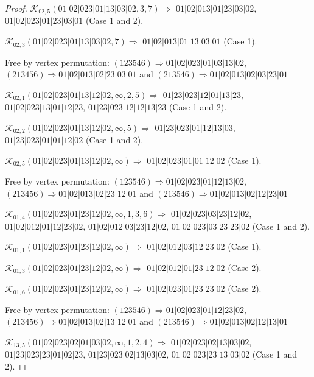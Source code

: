 \documentclass[12pt]{article}
\theoremstyle{plain}
\theoremstyle{definition}
\theoremstyle{remark}
\newcommand{\fancy}[1]{\mathcal{#1}}
\def\K{\fancy{K}}
\begin{document}
\begin{proof}
	$\K_{02,5}(01|02|023|01|13|03|02,3, 7)\Rightarrow $ $01|02|013|01|23|03|02$, $01|02|023|01|23|03|01$ (Case 1 and 2).
	
	$\K_{02,3}(01|02|023|01|13|03|02,7)\Rightarrow $ $01|02|013|01|13|03|01$ (Case 1).
	
	
	
	Free by vertex permutation: $(1 2 3 5 4 6)\Rightarrow 01|02|023|01|03|13|02$, $(2 1 3 4 5 6)\Rightarrow 01|02|013|02|23|03|01$ and $(2 1 3 5 4 6)\Rightarrow 01|02|013|02|03|23|01$
	
	
	
	\bigskip
	
	$\K_{02,1}(01|02|023|01|13|12|02,\infty,2, 5)\Rightarrow $ $01|23|023|12|01|13|23$, $01|02|023|13|01|12|23$, $01|23|023|12|12|13|23$ (Case 1 and 2).
	
	$\K_{02,2}(01|02|023|01|13|12|02,\infty,5)\Rightarrow $ $01|23|023|01|12|13|03$, $01|23|023|01|01|12|02$ (Case 1 and 2).
	
	$\K_{02,5}(01|02|023|01|13|12|02,\infty)\Rightarrow $ $01|02|023|01|01|12|02$ (Case 1).
	
	
	
	Free by vertex permutation: $(1 2 3 5 4 6)\Rightarrow 01|02|023|01|12|13|02$, $(2 1 3 4 5 6)\Rightarrow 01|02|013|02|23|12|01$ and $(2 1 3 5 4 6)\Rightarrow 01|02|013|02|12|23|01$
	
	
	
	\bigskip
	
	$\K_{01,4}(01|02|023|01|23|12|02,\infty,1, 3, 6)\Rightarrow $ $01|02|023|03|23|12|02$, $01|02|012|01|12|23|02$, $01|02|012|03|23|12|02$, $01|02|023|03|23|23|02$ (Case 1 and 2).
	
	$\K_{01,1}(01|02|023|01|23|12|02,\infty)\Rightarrow $ $01|02|012|03|12|23|02$ (Case 1).
	
	$\K_{01,3}(01|02|023|01|23|12|02,\infty)\Rightarrow $ $01|02|012|01|23|12|02$ (Case 2).
	
	$\K_{01,6}(01|02|023|01|23|12|02,\infty)\Rightarrow $ $01|02|023|01|23|23|02$ (Case 2).
	
	
	
	Free by vertex permutation: $(1 2 3 5 4 6)\Rightarrow 01|02|023|01|12|23|02$, $(2 1 3 4 5 6)\Rightarrow 01|02|013|02|13|12|01$ and $(2 1 3 5 4 6)\Rightarrow 01|02|013|02|12|13|01$
	
	
	
	\bigskip
	
	$\K_{13,5}(01|02|023|02|01|03|02,\infty,1, 2, 4)\Rightarrow $ $01|02|023|02|13|03|02$, $01|23|023|23|01|02|23$, $01|23|023|02|13|03|02$, $01|02|023|23|13|03|02$ (Case 1 and 2).
	

\end{proof}
\end{document}

